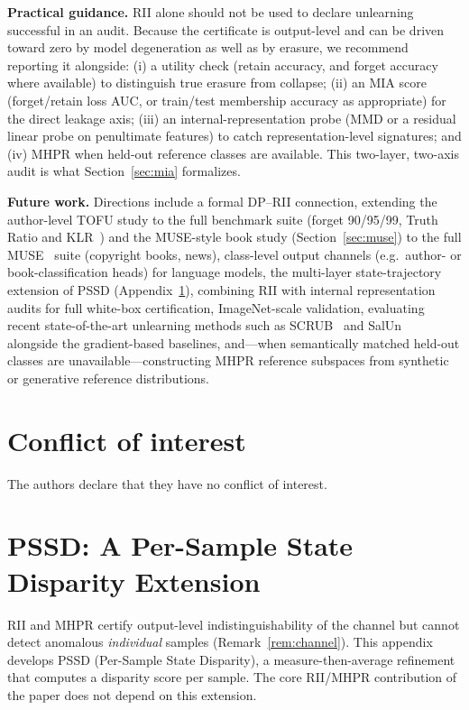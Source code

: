 \documentclass[smallextended]{svjour3}       %
\begin{document}
\textbf{Practical guidance.} RII alone should not be used to declare unlearning successful in an audit. Because the certificate is output-level and can be driven toward zero by model degeneration as well as by erasure, we recommend reporting it alongside: (i) a utility check (retain accuracy, and forget accuracy where available) to distinguish true erasure from collapse; (ii) an MIA score (forget/retain loss AUC, or train/test membership accuracy as appropriate) for the direct leakage axis; (iii) an internal-representation probe (MMD or a residual linear probe on penultimate features) to catch representation-level signatures; and (iv) MHPR when held-out reference classes are available. This two-layer, two-axis audit is what Section~\ref{sec:mia} formalizes.

\textbf{Future work.} Directions include a formal DP--RII connection, extending the author-level TOFU study to the full benchmark suite (forget 90/95/99, Truth Ratio and KLR~\cite{maini2024tofu}) and the MUSE-style book study (Section~\ref{sec:muse}) to the full MUSE~\cite{shi2024muse} suite (copyright books, news), class-level output channels (e.g.\ author- or book-classification heads) for language models, the multi-layer state-trajectory extension of PSSD (Appendix~\ref{app:pssd}), combining RII with internal representation audits for full white-box certification, ImageNet-scale validation, evaluating recent state-of-the-art unlearning methods such as SCRUB~\cite{kurmanji2023scrub} and SalUn~\cite{fan2024salun} alongside the gradient-based baselines, and---when semantically matched held-out classes are unavailable---constructing MHPR reference subspaces from synthetic or generative reference distributions.

\section*{Conflict of interest}
The authors declare that they have no conflict of interest.

\appendix
\section{PSSD: A Per-Sample State Disparity Extension}
\label{app:pssd}

RII and MHPR certify output-level indistinguishability of the channel but cannot detect anomalous \emph{individual} samples (Remark~\ref{rem:channel}). This appendix develops PSSD (Per-Sample State Disparity), a measure-then-average refinement that computes a disparity score per sample. The core RII/MHPR contribution of the paper does not depend on this extension.
\end{document}
